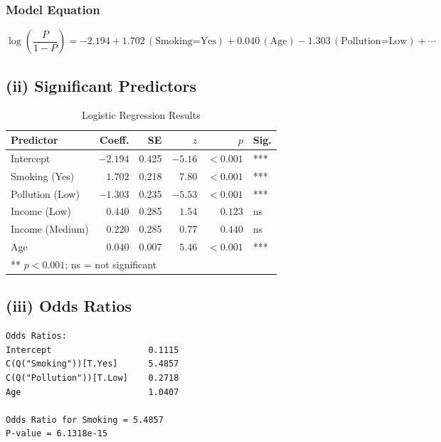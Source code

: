 \documentclass[12pt,a4paper]{article}
\begin{document}
\subsubsection{Model Equation}

\begin{equation}
  \log\!\left(\frac{P}{1-P}\right)
  = -2.194 + 1.702\,(\text{Smoking=Yes}) + 0.040\,(\text{Age})
    - 1.303\,(\text{Pollution=Low}) + \cdots
\end{equation}

\subsection{(ii) Significant Predictors}

\begin{table}[H]
  \centering
  \caption{Logistic Regression Results}
  \begin{tabular}{lrrrrl}
    \toprule
    \textbf{Predictor} & \textbf{Coeff.} & \textbf{SE} & \textbf{$z$} & \textbf{$p$} & \textbf{Sig.} \\
    \midrule
    Intercept          & $-2.194$ & 0.425 & $-5.16$ & $<0.001$ & *** \\
    Smoking (Yes)      &  $1.702$ & 0.218 & $7.80$  & $<0.001$ & *** \\
    Pollution (Low)    & $-1.303$ & 0.235 & $-5.53$ & $<0.001$ & *** \\
    Income (Low)       &  $0.440$ & 0.285 & $1.54$  & $0.123$  & ns  \\
    Income (Medium)    &  $0.220$ & 0.285 & $0.77$  & $0.440$  & ns  \\
    Age                &  $0.040$ & 0.007 & $5.46$  & $<0.001$ & *** \\
    \bottomrule
    \multicolumn{6}{l}{\small *** $p<0.001$; ns = not significant}
  \end{tabular}
\end{table}

\subsection{(iii) Odds Ratios}

\begin{lstlisting}[style=outputstyle]
Odds Ratios:
Intercept                   0.1115
C(Q("Smoking"))[T.Yes]      5.4857
C(Q("Pollution"))[T.Low]    0.2718
Age                         1.0407

Odds Ratio for Smoking = 5.4857
P-value = 6.1318e-15
\end{lstlisting}
\end{document}
